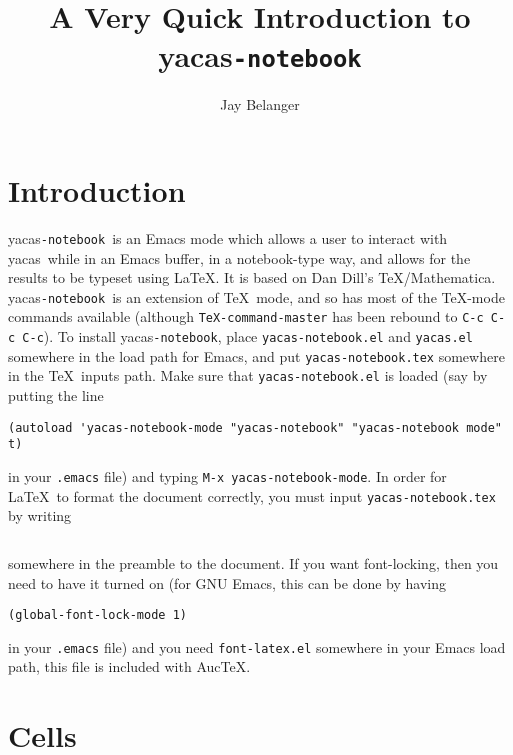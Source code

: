 \documentclass[12pt]{article}
\def\ys{\textsf{yacas}}
\def\yn{\textsf{yacas}\texttt{-notebook}}
\begin{document}
\title{A Very Quick Introduction to \yn}
\author{Jay Belanger}
\date{}

\maketitle

\section{Introduction}

\yn\ is an Emacs mode which allows a user to interact with \ys\
while in an Emacs buffer, in a notebook-type way, and allows for the
results to be typeset using \LaTeX.  It is based on Dan
Dill's \TeX/Mathematica.  \yn\ is an extension of
\TeX\ mode, and so has most of the \TeX-mode commands available
(although \texttt{TeX-command-master} has been rebound to 
\texttt{C-c C-c C-c}).  To install \yn, place \texttt{yacas-notebook.el} and
\texttt{yacas.el} somewhere in the load path for Emacs, and put
\texttt{yacas-notebook.tex} somewhere in the \TeX\ inputs path.  Make sure
that \texttt{yacas-notebook.el} is loaded  (say by putting the line
\begin{verbatim}
(autoload 'yacas-notebook-mode "yacas-notebook" "yacas-notebook mode" t)
\end{verbatim}
in your \texttt{.emacs} file) and typing \texttt{M-x yacas-notebook-mode}.  In
order for \LaTeX\ to format the document correctly, you must input
\texttt{yacas-notebook.tex} by writing
\begin{verbatim}

\end{verbatim}
somewhere in the preamble to the document.
If you want font-locking, then you need to have it turned on (for GNU
Emacs, this can be done by having  
\begin{verbatim}
(global-font-lock-mode 1)
\end{verbatim}
in your \texttt{.emacs} file) and you need
\texttt{font-latex.el} somewhere in
your Emacs load path, this file is included with Auc\TeX. 

\section{Cells}
\end{document}
